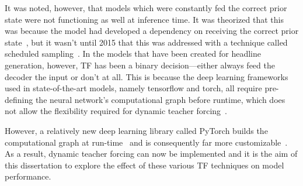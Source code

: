 It was noted, however, that models which were constantly fed the correct prior state were not functioning as well at inference time. It was theorized that this was because the model had developed a dependency on receiving the correct prior state~\cite{Bengio2015}, but it wasn't until 2015 that this was addressed with a technique called scheduled sampling~\cite{Bengio2015}. In the models that have been created for headline generation, however, TF has been a binary decision---either always feed the decoder the input or don't at all. This is because the deep learning frameworks used in state-of-the-art models, namely tensorflow and torch, all require pre-defining the neural network's computational graph before runtime, which does not allow the flexibility required for dynamic teacher forcing~\cite{Howard2017}.

However, a relatively new deep learning library called PyTorch builds the computational graph at run-time~\cite{Chintala2017} and is consequently far more customizable~\cite{Howard2017}. As a result, dynamic teacher forcing can now be implemented and it is the aim of this dissertation to explore the effect of these various TF techniques on model performance.